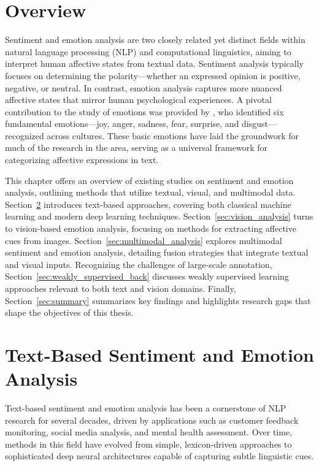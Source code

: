 \section{Overview}
Sentiment and emotion analysis are two closely related yet distinct fields within natural language processing (NLP) and computational linguistics, aiming to interpret human affective states from textual data. Sentiment analysis typically focuses on determining the polarity—whether an expressed opinion is positive, negative, or neutral. In contrast, emotion analysis captures more nuanced affective states that mirror human psychological experiences. A pivotal contribution to the study of emotions was provided by \citet{ekman1992there}, who identified six fundamental emotions—joy, anger, sadness, fear, surprise, and disgust—recognized across cultures. These basic emotions have laid the groundwork for much of the research in the area, serving as a universal framework for categorizing affective expressions in text.
\newline

This chapter offers an overview of existing studies on sentiment and emotion analysis, outlining methods that utilize textual, visual, and multimodal data. Section~\ref{sec:text_analysis} introduces text-based approaches, covering both classical machine learning and modern deep learning techniques. Section~\ref{sec:vision_analysis} turns to vision-based emotion analysis, focusing on methods for extracting affective cues from images.
Section~\ref{sec:multimodal_analysis} explores multimodal sentiment and emotion analysis, detailing fusion strategies that integrate textual and visual inputs.
Recognizing the challenges of large-scale annotation, Section~\ref{sec:weakly_supervised_back} discusses weakly supervised learning approaches relevant to both text and vision domains.
Finally, Section~\ref{sec:summary} summarizes key findings and highlights research gaps that shape the objectives of this thesis.


\section{Text-Based Sentiment and Emotion Analysis}
\label{sec:text_analysis}

Text-based sentiment and emotion analysis has been a cornerstone of NLP research for several decades, driven by applications such as customer feedback monitoring, social media analysis, and mental health assessment. Over time, methods in this field have evolved from simple, lexicon-driven approaches to sophisticated deep neural architectures capable of capturing subtle linguistic cues.

